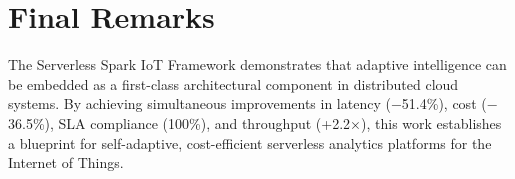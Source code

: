 \section{Final Remarks}
The Serverless Spark IoT Framework demonstrates that adaptive intelligence can be
embedded as a first-class architectural component in distributed cloud systems. By
achieving simultaneous improvements in latency ($-$51.4\%), cost ($-$36.5\%),
SLA compliance (100\%), and throughput (+2.2$\times$), this work establishes a
blueprint for self-adaptive, cost-efficient serverless analytics platforms for
the Internet of Things.
